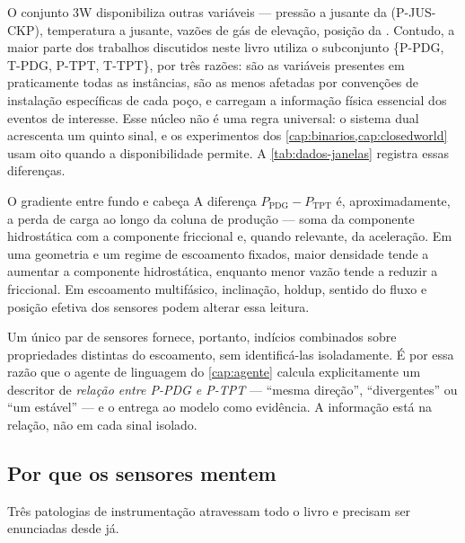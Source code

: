 O conjunto 3W disponibiliza outras variáveis --- pressão a jusante da 
(P-JUS-CKP), temperatura a jusante, vazões de gás de elevação, posição da .
Contudo, a maior parte dos trabalhos discutidos neste livro utiliza o subconjunto
\{P-PDG, T-PDG, P-TPT, T-TPT\}, por três razões: são as variáveis presentes em
praticamente todas as instâncias, são as menos afetadas por convenções de instalação
específicas de cada poço, e carregam a informação física essencial dos eventos de
interesse. Esse núcleo não é uma regra universal: o sistema dual acrescenta um quinto
sinal, e os experimentos dos \cref{cap:binarios,cap:closedworld} usam oito quando a
disponibilidade permite. A \cref{tab:dados-janelas} registra essas diferenças.

\begin{exemplo}{O gradiente entre fundo e cabeça}
A diferença $P_{\text{PDG}} - P_{\text{TPT}}$ é, aproximadamente, a perda de carga ao
longo da coluna de produção --- soma da componente hidrostática com a componente
friccional e, quando relevante, da aceleração. Em uma geometria e um regime de escoamento
fixados, maior densidade tende a aumentar a componente hidrostática, enquanto menor vazão
tende a reduzir a friccional. Em escoamento multifásico, inclinação, holdup, sentido do
fluxo e posição efetiva dos sensores podem alterar essa leitura.

Um único par de sensores fornece, portanto, indícios combinados sobre propriedades
distintas do escoamento, sem identificá-las isoladamente. É por essa razão que o agente de linguagem do
\cref{cap:agente} calcula explicitamente um descritor de \emph{relação entre P-PDG e
P-TPT} --- ``mesma direção'', ``divergentes'' ou ``um estável'' --- e o entrega ao
modelo como evidência. A informação está na relação, não em cada sinal isolado.
\end{exemplo}

\subsection{Por que os sensores mentem}

Três patologias de instrumentação atravessam todo o livro e precisam ser enunciadas
desde já.

